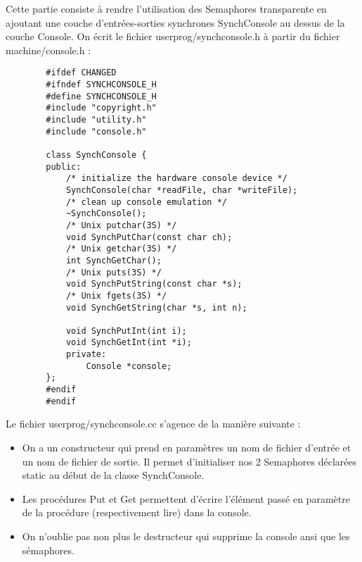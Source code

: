 \documentclass[a4paper,10pt]{article}
\begin{document}
    Cette partie consiste à rendre l'utilisation des Semaphores transparente en ajoutant une couche d'entrées-sorties synchrones SynchConsole au dessus de la couche Console.
    On écrit le fichier userprog/synchconsole.h à partir du fichier machine/console.h :

    \begin{lstlisting}
        #ifdef CHANGED
        #ifndef SYNCHCONSOLE_H
        #define SYNCHCONSOLE_H
        #include "copyright.h"
        #include "utility.h"
        #include "console.h"

        class SynchConsole {
        public:
            /* initialize the hardware console device */
            SynchConsole(char *readFile, char *writeFile);
            /* clean up console emulation */
            ~SynchConsole();
            /* Unix putchar(3S) */
            void SynchPutChar(const char ch);
            /* Unix getchar(3S) */
            int SynchGetChar();
            /* Unix puts(3S) */
            void SynchPutString(const char *s);
            /* Unix fgets(3S) */
            void SynchGetString(char *s, int n);

            void SynchPutInt(int i);
            void SynchGetInt(int *i);
            private:
                Console *console;
        };
        #endif
        #endif
    \end{lstlisting}

    Le fichier userprog/synchconsole.cc s'agence de la manière suivante :
    \begin{itemize}
        \item On a un constructeur qui prend en paramètres un nom de fichier d'entrée  et un nom de fichier de sortie. Il permet d'initialiser nos 2 Semaphores déclarées static au début de la classe SynchConsole.
        \item Les procédures Put et Get permettent d'écrire l'élément passé en paramètre de la procédure (respectivement lire) dans la console.
        \item On n'oublie pas non plus le destructeur qui supprime la console ansi que les sémaphores.
    \end{itemize}
\end{document}
